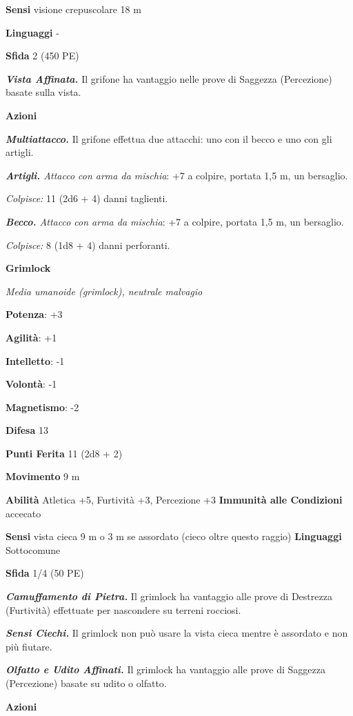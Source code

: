 \begin{multicols}{2}
\textbf{Sensi} visione crepuscolare 18 m

\textbf{Linguaggi} -

\textbf{Sfida} 2 (450 PE)

\emph{\textbf{Vista Affinata.}} Il grifone ha vantaggio nelle prove di
Saggezza (Percezione) basate sulla vista.

\textbf{Azioni}

\emph{\textbf{Multiattacco.}} Il grifone effettua due attacchi: uno con
il becco e uno con gli artigli.

\emph{\textbf{Artigli.} Attacco con arma da mischia}: +7 a colpire,
portata 1,5 m, un bersaglio.

\emph{Colpisce:} 11 (2d6 + 4) danni taglienti.

\emph{\textbf{Becco.} Attacco con arma da mischia}: +7 a colpire,
portata 1,5 m, un bersaglio.

\emph{Colpisce:} 8 (1d8 + 4) danni perforanti.

\textbf{Grimlock}

\emph{Media umanoide (grimlock), neutrale malvagio}

\textbf{Potenza}: +3

\textbf{Agilità}: +1

\textbf{Intelletto}: -1

\textbf{Volontà}: -1

\textbf{Magnetismo}: -2

\textbf{Difesa} 13

\textbf{Punti Ferita} 11 (2d8 + 2)

\textbf{Movimento} 9 m

\textbf{Abilità} Atletica +5, Furtività +3, Percezione +3
\textbf{Immunità alle Condizioni} accecato

\textbf{Sensi} vista cieca 9 m o 3 m se assordato (cieco oltre questo
raggio) \textbf{Linguaggi} Sottocomune

\textbf{Sfida} 1/4 (50 PE)

\emph{\textbf{Camuffamento di Pietra.}} Il grimlock ha vantaggio alle
prove di Destrezza (Furtività) effettuate per nascondere su terreni
rocciosi.

\emph{\textbf{Sensi Ciechi.}} Il grimlock non può usare la vista cieca
mentre è assordato e non più fiutare.

\emph{\textbf{Olfatto e Udito Affinati.}} Il grimlock ha vantaggio alle
prove di Saggezza (Percezione) basate su udito o olfatto.

\textbf{Azioni}


\end{multicols}

